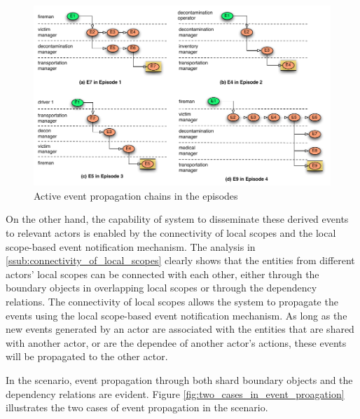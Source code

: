 \begin{figure}[htbp] %
	\centering
	\includegraphics[width=5.8in]{event_chains_in_eps.pdf} 
	\caption{Active event propagation chains in the episodes}
	\label{fig:event_chains_in_eps}
\end{figure}

On the other hand, the capability of system to disseminate these derived events to relevant actors is enabled by the connectivity of local scopes and the local scope-based event notification mechanism. The analysis in \ref{ssub:connectivity_of_local_scopes} clearly shows that the entities from different actors' local scopes can be connected with each other, either through the boundary objects in overlapping local scopes or through the dependency relations. The connectivity of local scopes allows the system to propagate the events using the local scope-based event notification mechanism. As long as the new events generated by an actor are associated with the entities that are shared with another actor, or are the dependee of another actor's actions, these events will be propagated to the other actor. 

In the scenario, event propagation through both shard boundary objects and the dependency relations are evident. Figure \ref{fig:two_cases_in_event_proagation} illustrates the two cases of event propagation in the scenario.

